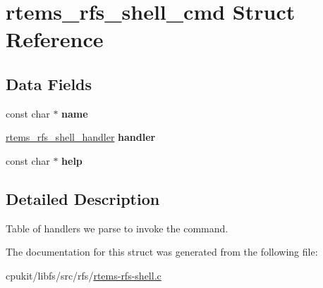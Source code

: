 \hypertarget{structrtems__rfs__shell__cmd}{}\section{rtems\+\_\+rfs\+\_\+shell\+\_\+cmd Struct Reference}
\label{structrtems__rfs__shell__cmd}
\subsection*{Data Fields}
\begin{DoxyCompactItemize}
\item 
\mbox{\label{structrtems__rfs__shell__cmd_a4f2ee0103ad05dc705cfddd3bd47adec}} 
const char $\ast$ {\bfseries name}
\item 
\mbox{\label{structrtems__rfs__shell__cmd_a7c5f4244bf619158074691621597a376}} 
\mbox{\hyperlink{rtems-rfs-shell_8c_ae8b3b669ad0ff98c8773ddd56bb66f32}{rtems\+\_\+rfs\+\_\+shell\+\_\+handler}} {\bfseries handler}
\item 
\mbox{\label{structrtems__rfs__shell__cmd_a078755dbdfe4dc0eefc568c95db7d11c}} 
const char $\ast$ {\bfseries help}
\end{DoxyCompactItemize}


\subsection{Detailed Description}
Table of handlers we parse to invoke the command. 

The documentation for this struct was generated from the following file\+:\begin{DoxyCompactItemize}
\item 
cpukit/libfs/src/rfs/\mbox{\hyperlink{rtems-rfs-shell_8c}{rtems-\/rfs-\/shell.\+c}}\end{DoxyCompactItemize}
